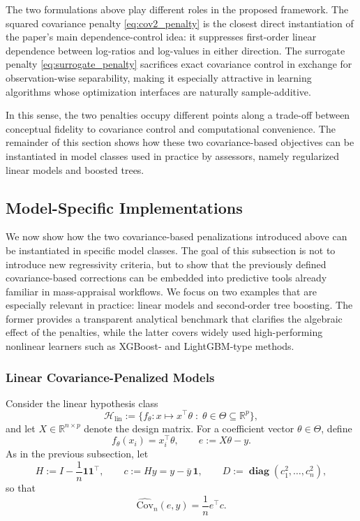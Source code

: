 \documentclass[12pt, draft]{article}
\theoremstyle{plain}
\theoremstyle{definition}
\newcommand{\R}{\mathbb{R}}
\newcommand{\1}{\mathbf{1}}
\newcommand{\Cov}{\text{Cov}}
\renewcommand{\H}{\mathcal{H}}
\renewcommand{\R}{\mathbb{R}}
\newcommand{\diag}{\mathbf{\operatorname{diag}}}
\begin{document}
{The two formulations above play different roles in the proposed framework. The squared covariance penalty \eqref{eq:cov2_penalty} is the closest direct instantiation of the paper's main dependence-control idea: it suppresses first-order linear dependence between log-ratios and log-values in either direction. The surrogate penalty \eqref{eq:surrogate_penalty} sacrifices exact covariance control in exchange for observation-wise separability, making it especially attractive in learning algorithms whose optimization interfaces are naturally sample-additive.

In this sense, the two penalties occupy different points along a trade-off between conceptual fidelity to covariance control and computational convenience. The remainder of this section shows how these two covariance-based objectives can be instantiated in model classes used in practice by assessors, namely regularized linear models and boosted trees.

\subsection{Model-Specific Implementations}
\label{sec:model_specific_implementations}

We now show how the two covariance-based penalizations introduced above can be instantiated in specific model classes. The goal of this subsection is not to introduce new regressivity criteria, but to show that the previously defined covariance-based corrections can be embedded into predictive tools already familiar in mass-appraisal workflows. We focus on two examples that are especially relevant in practice: linear models and second-order tree boosting. The former provides a transparent analytical benchmark that clarifies the algebraic effect of the penalties, while the latter covers widely used high-performing nonlinear learners such as XGBoost- and LightGBM-type methods.

\subsubsection{Linear Covariance-Penalized Models}
\label{subsec:linear_models}

Consider the linear hypothesis class
\[
\H_{\mathrm{lin}} := \{f_\theta : x \mapsto x^\top \theta \;:\; \theta \in \Theta \subseteq \R^p\},
\]
and let $X \in \R^{n\times p}$ denote the design matrix. For a coefficient vector $\theta \in \Theta$, define
\[
f_\theta(x_i) = x_i^\top \theta,
\qquad
e := X\theta - y.
\]
As in the previous subsection, let
\[
H := I - \frac{1}{n}\mathbf{1}\mathbf{1}^\top,
\qquad
c := Hy = y - \bar y\,\mathbf{1},
\qquad
D := \diag(c_1^2,\dots,c_n^2),
\]
so that
\[
\widehat{\Cov}_n(e,y)
=
\frac{1}{n}e^\top c.
\]

}
\end{document}
